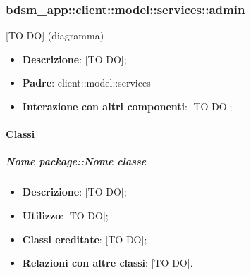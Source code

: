 \subsubsection{bdsm\_app::client::model::services::admin} %
\label{ssub:bdsm_app_client_model_services_admin}
[TO DO] (diagramma) \newline \newline

\begin{itemize}
	\item \textbf{Descrizione}: [TO DO];
	\item \textbf{Padre}: client::model::services
	\item \textbf{Interazione con altri componenti}: [TO DO];
\end{itemize}

	\paragraph{Classi} %
		\subparagraph{Nome package::Nome classe} %
		\label{subp:subparagraph_name}
			\begin{itemize}
				\item \textbf{Descrizione}: [TO DO];
				\item \textbf{Utilizzo}: [TO DO];
				\item \textbf{Classi ereditate}: [TO DO];
				\item \textbf{Relazioni con altre classi}: [TO DO].
			\end{itemize}	
